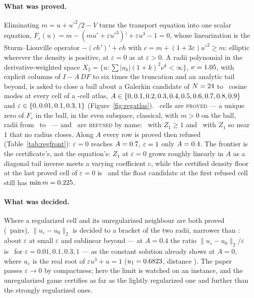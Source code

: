 \documentclass[11pt]{article}
\begin{document}
\paragraph{What was proved.} Eliminating $m = u + u'^2/2 - V$ turns the transport equation into one scalar equation, $F_\varepsilon(u) = m - (m u' + \varepsilon u'^3)' + \varepsilon u^3 - 1 = 0$, whose linearization is the Sturm--Liouville operator $-(c h')' + e h$ with $c = m + (1 + 3\varepsilon)u'^2 \ge m$: elliptic wherever the density is positive, at $\varepsilon = 0$ as at $\varepsilon > 0$. A radii polynomial in the derivative-weighted space $X_2 = \{u : \sum|u_k|(1 + k)^2\nu^k < \infty\}$, $\nu = 1.05$, with explicit columns of $I - A\,DF$ to six times the truncation and an analytic tail beyond, is asked to close a ball about a Galerkin candidate of $N = 24$ to \RGNMax\ cosine modes at every cell of a \RGCells-cell atlas, $A \in \{0, 0.1, 0.2, 0.3, 0.4, 0.5, 0.6, 0.7, 0.8, 0.9\}$ and $\varepsilon \in \{0, 0.01, 0.1, 0.3, 1\}$ (Figure~\ref{fig:regatlas}). \RGProved\ cells are \textsc{proved} --- a unique zero of $F_\varepsilon$ in the ball, in the even subspace, classical, with $m > 0$ on the ball, radii from \RGrMin\ to \RGrMax\ --- and \RGRefused\ are \textsc{refused} by name: \RGRefusedZOne\ with $Z_1 \ge 1$ and \RGRefusedNear\ with $Z_1$ so near $1$ that no radius closes. Along $A$ every row is proved then refused (Table~\ref{tab:regfront}): $\varepsilon = 0$ reaches $A = 0.7$, $\varepsilon = 1$ only $A = 0.4$. The frontier is the certificate's, not the equation's: $Z_1$ at $\varepsilon = 0$ grows roughly linearly in $A$ as a diagonal tail inverse meets a varying coefficient $c$, while the certified density floor at the last proved cell of $\varepsilon = 0$ is \RGFloorLastZero\ and the float candidate at the first refused cell still has $\min m = 0.225$.

\paragraph{What was decided.} Where a regularized cell and its unregularized neighbour are both proved (\RGDistDecided\ pairs), $\|u_\varepsilon - u_0\|_2$ is decided to a bracket of the two radii, narrower than \RGDistMaxWidth: about $\varepsilon$ at small $\varepsilon$ and sublinear beyond --- at $A = 0.4$ the ratio $\|u_\varepsilon - u_0\|_2/\varepsilon$ is \RGRatiosAFour\ for $\varepsilon = 0.01, 0.1, 0.3, 1$ --- as the constant solution already shows at $A = 0$, where $u_\varepsilon$ is the real root of $\varepsilon u^3 + u = 1$ ($u_1 = 0.6823$, distance \RGDistZeroOne). The paper passes $\varepsilon \to 0$ by compactness; here the limit is watched on an instance, and the unregularized game certifies as far as the lightly regularized one and further than the strongly regularized ones.
\end{document}
